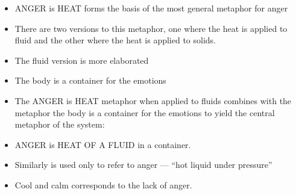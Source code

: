 \documentclass[a4paper,landscape,headrule,footrule,xetex]{foils}
\begin{document}

\begin{itemize}
\item ANGER is HEAT forms the basis of the most
  general metaphor for anger
\item There are two versions to this metaphor,
  one where the heat is applied to fluid and
  the other where the heat is applied to
  solids.
\item The fluid version is more elaborated
\end{itemize}

\begin{itemize}
\item The body is a container for the emotions
\begin{exe}
  \ex {}
  \ex {}
  \ex {}
  \ex {}
\end{exe}
\item
The ANGER is HEAT metaphor when applied to fluids combines with the
metaphor the body is a container for the emotions to yield the central
metaphor of the system:
\item ANGER is HEAT OF A FLUID in a container.
\begin{exe}
  \ex {}
  \ex {}
  \ex {}
  \ex {}
  \ex {}
\end{exe}

\item Similarly  is used only to refer to anger --- ``hot liquid under
pressure''
\item Cool and calm corresponds to the lack of anger.
\begin{exe}
  \ex {}
  \ex {}
\end{exe}


\end{itemize}
\end{document}

